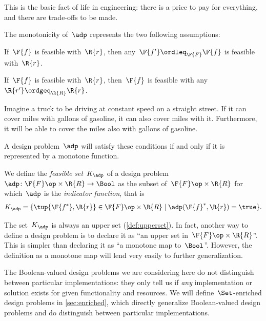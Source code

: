 This is the basic fact of life in engineering: there is a price to pay for everything, and there are trade-offs to be made.

The monotonicity of~$\adp$ represents the two following assumptions:

\begin{compactenum}
\item If~$\F{f}$ is feasible with~$\R{r}$, then any~$\F{f'} \ordleq_\F{F} \F{f}$ is feasible with~$\R{r}$.
\item If~$\F{f}$ is feasible with~$\R{r}$, then~$\F{f}$ is feasible with any~$\R{r'} \ordgeq_\R{R} \R{r}$.
\end{compactenum}

\begin{example}
Imagine a truck to be driving at constant speed on a straight street. If it can cover \unit[100]{miles} with \unit[5]{gallons} of gasoline, it can also cover \unit[80]{miles} with it. Furthermore, it will be able to cover the \unit[100]{miles} also with \unit[10]{gallons} of gasoline.
\end{example}

A design problem~$\adp$ will satisfy these conditions if and only if it is represented by a monotone function.
\begin{definition}
We define the \emph{feasible set}~$K_\adp$ of a design problem~$\adp\colon \F{F}\op \times \R{R}\to \Bool$ as the subset of~$\F{F} \op\times \R{R}$ for which~$\adp$ is the \emph{indicator function}, that is
\begin{equation}
    K_\adp = \{ \tup{\F{f^*},\R{r}} \in \F{F} \op\times \R{R}  \mid
            \adp(\F{f}^*, \R{r}) = \true
                \}.
\end{equation}
\end{definition}
\begin{remark}
The set~$K_\adp$ is always an upper set (\cref{def:upperset}). In fact, another way to define a design problem is to declare it as ``an upper
set in~$\F{F}\op \times \R{R}$''. This is simpler than declaring it as ``a monotone map to~$\Bool$''. However, the definition as a monotone map will lend very easily to further generalization.
\end{remark}
The Boolean-valued design problems we are considering here do not distinguish between particular implementations: they only tell us if \emph{any} implementation or solution exists for given functionality and resources. We will define~$\Set$-enriched design problems in \cref{sec:enriched}, which directly generalize Boolean-valued design problems and do distinguish between particular implementations.

